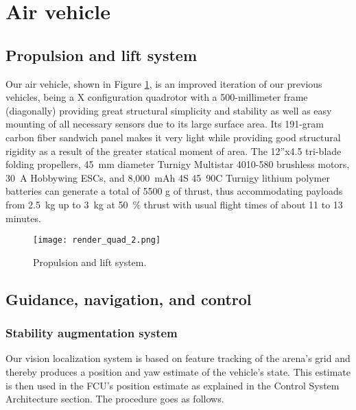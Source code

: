 \section*{Air vehicle} \label{sec:vehicle}

\subsection*{Propulsion and lift system} \label{subsec:vehicle-proplift}

Our air vehicle, shown in Figure \ref{fig:propulsion-system}, is an improved iteration of our previous vehicles, being a X configuration quadrotor with a 500-millimeter frame (diagonally) providing great structural simplicity and stability as well as easy mounting of all necessary sensors due to its large surface area. Its 191-gram carbon fiber sandwich panel makes it very light while providing good structural rigidity as a result of the greater statical moment of area. The 12”x4.5 tri-blade folding propellers, 45~mm diameter Turnigy Multistar 4010-580 brushless motors, 30~A Hobbywing ESCs, and 8,000~mAh 4S 45~90C Turnigy lithium polymer batteries can generate a total of 5500 g of thrust, thus accommodating payloads from 2.5~kg up to 3~kg at 50~\% thrust with usual flight times of about 11 to 13 minutes.

\begin{figure}[h]
	\texttt{[image: render\_quad\_2.png]}
	\vspace{-0.3cm}
	\caption{Propulsion and lift system.}
	\label{fig:propulsion-system}
\end{figure}


\subsection*{Guidance, navigation, and control} \label{subsec:vehicle-gnc}

\subsubsection*{Stability augmentation system}

Our vision localization system is based on feature tracking of the arena’s grid and thereby produces a position and yaw estimate of the vehicle’s state. This estimate is then used in the FCU’s position estimate as explained in the Control System Architecture section. The procedure goes as follows.

